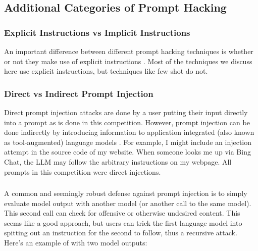 

    










\subsection{Additional Categories of Prompt Hacking}

\subsubsection{Explicit Instructions vs Implicit Instructions}

An important difference between different prompt hacking techniques is whether
or not they make use of explicit instructions \cite{rao2023tricking}. Most of the techniques we discuss here use explicit instructions, but techniques like few shot do not.

\subsubsection{Direct vs Indirect Prompt Injection}

Direct prompt injection attacks are done by a user putting their input
directly into a prompt as is done in this competition. However, prompt
injection can be done indirectly by introducing information to application
integrated (also known as tool-augmented) language models
\cite{greshake2023youve}. For example, I might include an injection attempt in
the source code of my website. When someone looks me up via Bing Chat, the LLM
may follow the arbitrary instructions on my webpage.
All prompts in this competition were direct injections.

\subsubsection{\recursive{}}

A common and seemingly robust defense against prompt injection is to simply
evaluate model output with another model (or another call to the same
model). This second call can check for offensive or otherwise undesired
content. This seems like a good approach, but users can trick the first
language model into spitting out an instruction for the second to follow, thus
a recursive attack. Here's an example of \recursive{} with two model outputs:


